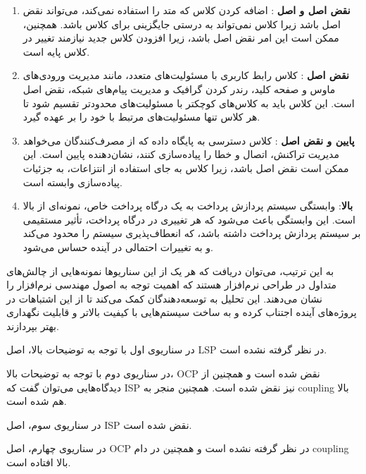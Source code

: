 \begin{enumerate}
	\item \textbf{نقض اصل  و اصل }: اضافه کردن کلاس  که متد  را استفاده نمی‌کند، می‌تواند نقض اصل  باشد زیرا کلاس  نمی‌تواند به درستی جایگزینی برای کلاس  باشد. همچنین، ممکن است این امر نقض اصل  باشد، زیرا افزودن کلاس جدید نیازمند تغییر در کلاس پایه است.
	
	\item \textbf{نقض اصل }: کلاس رابط کاربری با مسئولیت‌های متعدد، مانند مدیریت ورودی‌های ماوس و صفحه کلید، رندر کردن گرافیک و مدیریت پیام‌های شبکه، نقض اصل  است. این کلاس باید به کلاس‌های کوچکتر با مسئولیت‌های محدودتر تقسیم شود تا هر کلاس تنها مسئولیت‌های مرتبط با خود را بر عهده گیرد.
	
	\item \textbf{ پایین و نقض اصل }: کلاس دسترسی به پایگاه داده که از مصرف‌کنندگان می‌خواهد مدیریت تراکنش، اتصال و خطا را پیاده‌سازی کنند، نشان‌دهنده  پایین است. این ممکن است نقض اصل  باشد، زیرا کلاس به جای استفاده از انتزاعات، به جزئیات پیاده‌سازی وابسته است.
	
	\item \textbf{ بالا}: وابستگی سیستم پردازش پرداخت به یک درگاه پرداخت خاص، نمونه‌ای از  بالا است. این وابستگی باعث می‌شود که هر تغییری در درگاه پرداخت، تأثیر مستقیمی بر سیستم پردازش پرداخت داشته باشد، که انعطاف‌پذیری سیستم را محدود می‌کند و به تغییرات احتمالی در آینده حساس می‌شود.
\end{enumerate}

به این ترتیب، می‌توان دریافت که هر یک از این سناریوها نمونه‌هایی از چالش‌های متداول در طراحی نرم‌افزار هستند که اهمیت توجه به اصول مهندسی نرم‌افزار را نشان می‌دهند. این تحلیل به توسعه‌دهندگان کمک می‌کند تا از این اشتباهات در پروژه‌های آینده اجتناب کرده و به ساخت سیستم‌هایی با کیفیت بالاتر و قابلیت نگهداری بهتر بپردازند.

در سناریوی اول با توجه به توضیحات بالا، اصل LSP در نظر گرفته نشده است.

در سناریوی دوم با توجه به توضیحات بالا، OCP نقض شده است و همچنین از دیدگاه‌هایی می‌توان گفت که ISP نیز نقض شده است. همچنین منجر به coupling بالا هم شده است.

در سناریوی سوم، اصل ISP نقض شده است.

در سناریوی چهارم، اصل OCP در نظر گرفته نشده است و همچنین در دام coupling بالا افتاده است.